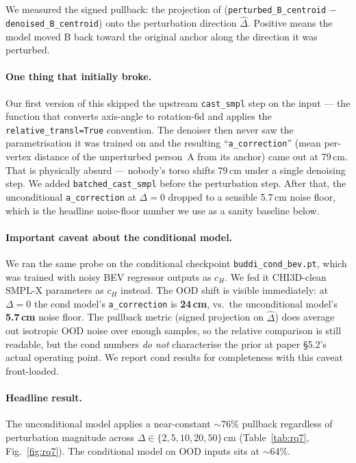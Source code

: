 \documentclass[10pt]{article}
\begin{document}
We measured the signed pullback: the projection of (\texttt{perturbed\_B\_centroid} $-$ \texttt{denoised\_B\_centroid}) onto the perturbation direction $\hat{\Delta}$. Positive means the model moved B back toward the original anchor along the direction it was perturbed.

\paragraph{One thing that initially broke.}
Our first version of this skipped the upstream \texttt{cast\_smpl} step on the input --- the function that converts axis-angle to rotation-6d and applies the \texttt{relative\_transl=True} convention. The denoiser then never saw the parametrisation it was trained on and the resulting ``\texttt{a\_correction}'' (mean per-vertex distance of the unperturbed person~A from its anchor) came out at 79\,cm. That is physically absurd --- nobody's torso shifts 79\,cm under a single denoising step. We added \texttt{batched\_cast\_smpl} before the perturbation step. After that, the unconditional \texttt{a\_correction} at $\Delta{=}0$ dropped to a sensible 5.7\,cm noise floor, which is the headline noise-floor number we use as a sanity baseline below.

\paragraph{Important caveat about the conditional model.}
We ran the same probe on the conditional checkpoint \texttt{buddi\_cond\_bev.pt}, which was trained with noisy BEV regressor outputs as $c_H$. We fed it CHI3D-clean SMPL-X parameters as $c_H$ instead. The OOD shift is visible immediately: at $\Delta{=}0$ the cond model's \texttt{a\_correction} is \textbf{24\,cm}, vs.\ the unconditional model's \textbf{5.7\,cm} noise floor. The pullback metric (signed projection on $\hat{\Delta}$) does average out isotropic OOD noise over enough samples, so the relative comparison is still readable, but the cond numbers \emph{do not} characterise the prior at paper §5.2's actual operating point. We report cond results for completeness with this caveat front-loaded.

\paragraph{Headline result.}
The unconditional model applies a near-constant $\sim$76\% pullback regardless of perturbation magnitude across $\Delta \in \{2, 5, 10, 20, 50\}$\,cm (Table~\ref{tab:rq7}, Fig.~\ref{fig:rq7}). The conditional model on OOD inputs sits at $\sim$64\%.
\end{document}
